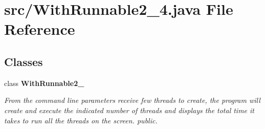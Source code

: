 \section{src/\+With\+Runnable2\+\_\+4.java File Reference}
\label{_with_runnable2__4_8java}
\subsection*{Classes}
\begin{DoxyCompactItemize}
\item 
class {\bf With\+Runnable2\+\_}
\begin{DoxyCompactList}\small\item\em From the command line parameters receive few threads to create, the program will create and execute the indicated number of threads and displays the total time it takes to run all the threads on the screen.  public. \end{DoxyCompactList}\end{DoxyCompactItemize}
